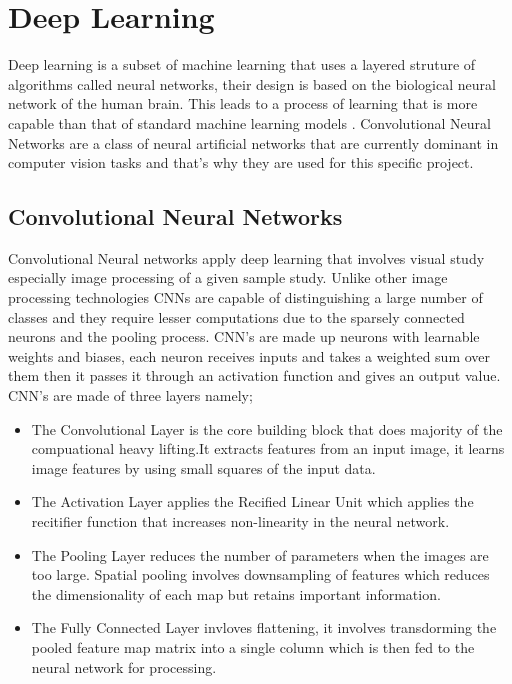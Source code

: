 \documentclass[12pt]{report}
\begin{document}
\section{Deep Learning}
Deep learning is a subset of machine learning that uses a layered struture of algorithms called neural networks, their design is based on the biological neural network of the human brain. This leads to a process of learning that is more capable than that of standard machine learning models \cite{Deep-Learning}.
Convolutional Neural Networks are a class of neural artificial networks that are currently dominant in computer vision tasks and that's why they are used for this specific project.


\subsection{Convolutional Neural Networks}
Convolutional Neural networks apply deep learning that involves visual study especially image processing of a given sample study. Unlike other image processing technologies CNNs are capable of distinguishing a large number of classes and they require lesser computations due to the sparsely connected neurons and the pooling process\cite{Y.J.Cha}.
CNN's are made up neurons with learnable weights and biases, each neuron receives inputs and takes a weighted sum over them then it passes it through an activation function and gives an output value. CNN's are made of three layers namely\cite{Raghav};

\begin{itemize}[topsep=0pt]

\item The Convolutional Layer is the core building block that does majority of the compuational heavy lifting.It extracts features from an input image, it learns image features by using small squares of the input data.

\item The Activation Layer applies the Recified Linear Unit which applies the recitifier function that increases non-linearity in the neural network.
\item The Pooling Layer reduces the number of parameters when the images are too large. Spatial pooling involves downsampling of features which reduces the dimensionality of each map but retains important information.

\item The Fully Connected Layer invloves flattening, it involves transdorming the pooled feature map matrix into a single column which is then fed to the neural network for processing.

\end{itemize}
\end{document}
